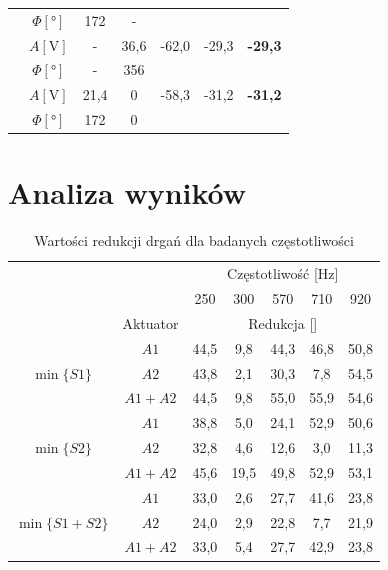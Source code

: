 \documentclass[polish,a4paper,11pt]{mwart}
\let\Oldsection\section
\renewcommand{\section}{\FloatBarrier\Oldsection}
\begin{document}
\begin{table}[!tbh]
\begin{tabular}{|c|c|c|c|c|c|c|}
				       &$\Phi [\si{\degree}]$ & 172 & - & \multicolumn{3}{c}{}\\\cline{2-7}
				       &   $A [\si{\V}]$ & - & 36,6 & -62,0 & -29,3 & \textbf{-29,3} \\\cline{2-7}
				       &$\Phi [\si{\degree}]$ & - & 356 & \multicolumn{3}{c}{}\\\cline{2-7}
				       &   $A [\si{\V}]$ & 21,4 & 0 & -58,3 & -31,2 & \textbf{-31,2} \\\cline{2-7}
				       &$\Phi [\si{\degree}]$ & 172 & 0 & \multicolumn{3}{c}{}\\\cline{1-4}
  \end{tabular}
\end{table}

\section{Analiza wyników}

\begin{table}[!tbh]
  \centering
  \caption{Wartości redukcji drgań dla badanych częstotliwości}
  \begin{tabular}{|c|c|c|c|c|c|c|}
    \cline{3-7}
    \multicolumn{2}{c|}{} & \multicolumn{5}{c|}{Częstotliwość [\si{\hertz}]} \\\cline{3-7}
	\multicolumn{2}{c|}{}			& 250 & 300 & 570 & 710 & 920 \\\cline{2-7}
	\multicolumn{1}{c|}{} & Aktuator & \multicolumn{5}{c|}{Redukcja [\si{\decibelV}]} \\\hline
    \multirow{3}{*}{$\min\{S1\}$}      & $A1$      & 44,5 & 9,8 & 44,3 & 46,8 & 50,8 \\\cline{2-7}
				       & $A2$      & 43,8 & 2,1 & 30,3 & 7,8 & 54,5 \\\cline{2-7}
				       & $A1 + A2$ & 44,5 & 9,8 & 55,0 & 55,9 & 54,6 \\\hline
    \multirow{3}{*}{$\min\{S2\}$}      & $A1$      & 38,8 & 5,0 & 24,1 & 52,9 & 50,6 \\\cline{2-7}
				       & $A2$      & 32,8 & 4,6 & 12,6 & 3,0 & 11,3 \\\cline{2-7}
				       & $A1 + A2$ & 45,6 & 19,5 & 49,8 & 52,9 & 53,1 \\\hline
    \multirow{3}{*}{$\min\{S1 + S2\}$} & $A1$      & 33,0 & 2,6 & 27,7 & 41,6 & 23,8 \\\cline{2-7}
				       & $A2$      & 24,0 & 2,9 & 22,8 & 7,7 & 21,9 \\\cline{2-7}
				       & $A1 + A2$ & 33,0 & 5,4 & 27,7 & 42,9 & 23,8 \\\hline
  \end{tabular}
  \label{tab:redukcja}
\end{table}
\end{document}
